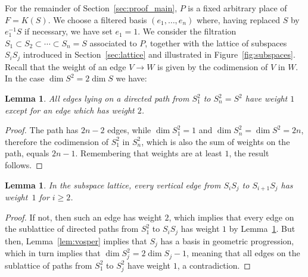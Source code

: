 \documentclass[10pt]{amsart}
\newtheorem{lemm}[theo]{Lemma}
\theoremstyle{definition}
\theoremstyle{remark}
\renewcommand{\geq}{\geqslant}
\begin{document}
For the remainder of Section~\ref{sec:proof_main}, $P$ is a fixed arbitrary place of $F=K(S)$. We choose a filtered basis $(e_1, \ldots, e_n)$ where, having replaced $S$ by $e_1^{-1}S$ if necessary, we have set $e_1=1$. We consider the filtration $S_1 \subset S_2\subset \cdots \subset S_n= S$ associated to $P$, together with the lattice of subspaces $S_iS_j$ introduced in Section~\ref{sec:lattice} and illustrated in Figure~\ref{fig:subspaces}. Recall that the weight of an edge $V\rightarrow W$ is given by the codimension of $V$ in $W$. In the case $\dim S^2=2\dim S$ we have:

\begin{lemm}\label{lem:weight2}
All edges lying on a directed path from $S_1^2$ to $S_n^2= S^2$ have weight $1$ except for an edge which has weight $2$.
\end{lemm}

\begin{proof}
The path has $2n-2$ edges, while $\dim S_1^2=1$ and $\dim S_n^2=\dim S^2=2n$, therefore the codimension of $S_1^2$ in $S_n^2$, which is also the sum of weights on the path, equals $2n-1$. Remembering that weights are at least $1$, the result follows.
\end{proof}

\begin{lemm}\label{lem:vertical}
In the subspace lattice, every vertical edge from $S_iS_j$ to $S_{i+1}S_j$ has weight~$1$ for $i\geq2$.
\end{lemm}

\begin{proof}
If not, then such an edge has weight $2$, which implies that every edge on the sublattice of directed paths from $S_1^2$ to $S_iS_j$ has weight $1$ by Lemma~\ref{lem:weight2}. But then, Lemma~\ref{lem:vosper} implies that $S_j$ has a basis in geometric progression, which in turn implies that $\dim S_j^2=2\dim S_j-1$, meaning that all edges on the sublattice of paths from $S_1^2$ to $S_j^2$ have weight $1$, a contradiction.
\end{proof}
\end{document}
